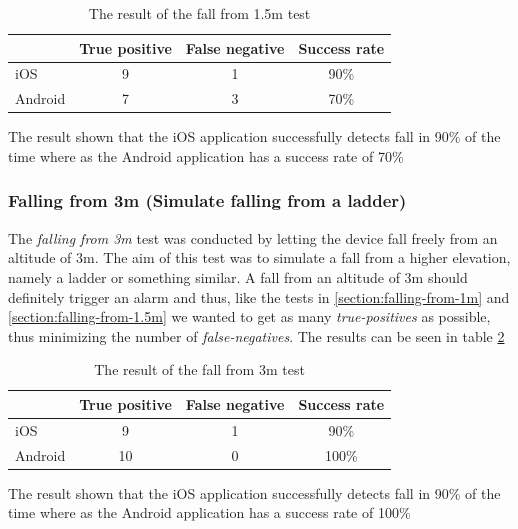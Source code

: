 \documentclass[12pt, a4paper, onecolumn]{article}
\begin{document}
	\begin{table}[H]
		\centering
		\begin{tabular}{|l|c|c|c|}
			\hline
			& True positive & False negative & Success rate \\ \hline
			iOS     & 9            & 1             & 90\%        \\ \hline
			Android & 7            & 3              & 70\%        \\ \hline
		\end{tabular}
		\caption{The result of the fall from 1.5m test}
		\label{table:fall-from-1.5m}
	\end{table}
	
	The result shown that the iOS application successfully detects fall in 90\% of the time where as the Android application has a success rate of 70\%
	
	
	\subsubsection{Falling from 3m (Simulate falling from a ladder)}
	The \textit{falling from 3m} test was conducted by letting the device fall freely from an altitude of 3m. The aim of this test was to simulate a fall from a higher elevation, namely a ladder or something similar. A fall from an altitude of 3m should definitely trigger an alarm and thus, like the tests in \ref{section:falling-from-1m} and \ref{section:falling-from-1.5m} we wanted to get as many \textit{true-positives} as possible, thus minimizing the number of \textit{false-negatives}. The results can be seen in table \ref{table:fall-from-3m}
	
	\begin{table}[H]
		\centering
		\begin{tabular}{|l|c|c|c|}
			\hline
			& True positive & False negative & Success rate \\ \hline
			iOS     & 9            & 1             & 90\%        \\ \hline
			Android & 10           & 0             & 100\%        \\ \hline
		\end{tabular}
		\caption{The result of the fall from 3m test}
		\label{table:fall-from-3m}
	\end{table}
	
	The result shown that the iOS application successfully detects fall in 90\% of the time where as the Android application has a success rate of 100\%
	
	\newpage
	
\end{document}
